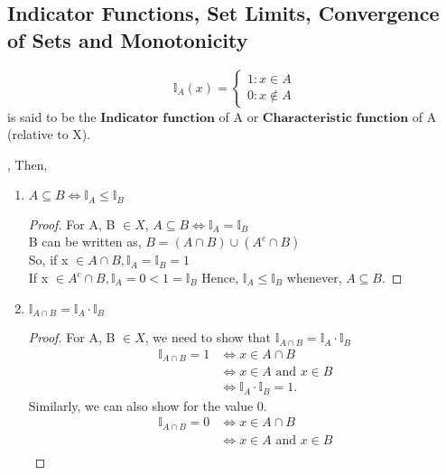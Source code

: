\documentclass[letterpaper, 12pt]{article}
\newcommand{\1}{\mathds{1}}	%
\theoremstyle{definition}
\begin{document}
{\subsection{Indicator Functions, Set Limits, Convergence of Sets and Monotonicity}
\[\mathds{I}_{A}(x) = \begin{cases}
    1 : x \in A \\
    0 : x \notin A
\end{cases}\]
is said to be the $\textbf{Indicator function}$ of A or $\textbf{Characteristic function}$ of A (relative to X).

, Then, 
\begin{enumerate}
    \item $A \subseteq B \Longleftrightarrow \mathds{I}_{A} \leq \mathds{I}_{B}$
    \begin{proof}
        For A, B $\in X$, $A \subseteq B \Longleftrightarrow \mathds{I}_{A} = \mathds{I}_{B}$ \\
        B can be written as, $B = (A \cap B) \cup (A^{c} \cap B)$ \\
        So, if x $\in A \cap B, \mathds{I}_{A} = \mathds{I}_{B} = 1$ \\
        If x $\in A^c \cap B, \mathds{I}_{A} = 0 < 1 = \mathds{I}_{B}$
        Hence, $\mathds{I}_{A} \leq \mathds{I}_{B}$ whenever, $A \subseteq B.$
    \end{proof}
    \item $\mathds{I}_{A \cap B} = \mathds{I}_{A} \cdot \mathds{I}_{B}$
    \begin{proof}
        For A, B $\in X$, we need to show that $\mathds{I}_{A \cap B} = \mathds{I}_{A} \cdot \mathds{I}_{B}$
        \begin{align*}
            \mathds{I}_{A \cap B} = 1 &\Longleftrightarrow x \in A \cap B \\
            &\Longleftrightarrow x \in A \text{ and } x \in B \\
            &\Longleftrightarrow \mathds{I}_{A} \cdot \mathds{I}_{B} = 1.
        \end{align*}
        Similarly, we can also show for the value 0.
        \begin{align*}
            \mathds{I}_{A \cap B} = 0 &\Longleftrightarrow x \in A \cap B \\
            &\Longleftrightarrow x \in A \text{ and } x \in B \\

\end{align*}
\end{proof}
\end{enumerate}}
\end{document}
